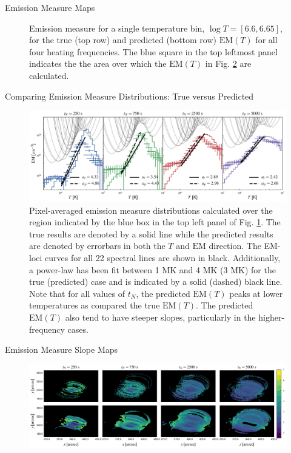 \documentclass[final]{beamer}
\begin{document}
\begin{frame}
\begin{columns}[T]
\begin{column}{0.49\linewidth}
\begin{block}{Emission Measure Maps}
\begin{figure}
        \caption{Emission measure for a single temperature bin, $\log{T}=[6.6,6.65]$, for the true (top row) and predicted (bottom row) $\mathrm{EM}(T)$ for all four heating frequencies. The blue square in the top leftmost panel indicates the the area over which the $\mathrm{EM}(T)$ in Fig. \ref{fig:em_1d} are calculated.} 
        \label{fig:total_em_map}
      \end{figure}
      \vspace{-1ex}
    \end{block}
    \begin{block}{Comparing Emission Measure Distributions: True versus Predicted}
      \begin{figure}
        \includegraphics[width=\columnwidth]{figures/em_1d_compare.pdf}
        \caption{Pixel-averaged emission measure distributions calculated over the region indicated by the blue box in the top left panel of Fig. \ref{fig:total_em_map}. The true results are denoted by a solid line while the predicted results are denoted by errorbars in both the $T$ and $\mathrm{EM}$ direction. The EM-loci curves for all 22 spectral lines are shown in black. Additionally, a power-law has been fit between 1 MK and 4 MK (3 MK) for the true (predicted) case and is indicated by a solid (dashed) black line. Note that for all values of $t_N$, the predicted $\mathrm{EM}(T)$ peaks at lower temperatures as compared the true $\mathrm{EM}(T)$. The predicted $\mathrm{EM}(T)$ also tend to have steeper slopes, particularly in the higher-frequency cases.}
        \label{fig:em_1d}
      \end{figure}
      \vspace{-0.5ex}
    \end{block}
    \begin{block}{Emission Measure Slope Maps}
      \begin{figure}
        \includegraphics[width=\columnwidth]{figures/em_slope_maps.pdf}

\end{figure}
\end{block}
\end{column}
\end{columns}
\end{frame}
\end{document}

